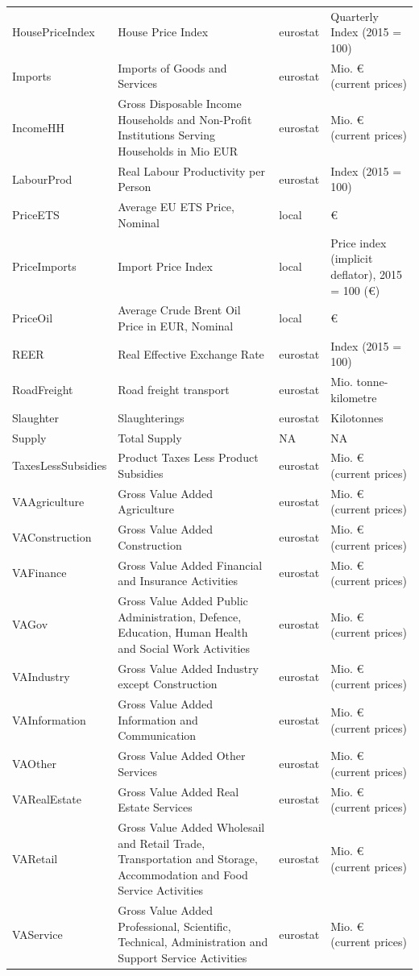 \begin{longtable}[t]{>{\raggedright\arraybackslash}p{3.5cm}>{\raggedright\arraybackslash}p{5.5cm}>{\raggedright\arraybackslash}p{2cm}>{\raggedright\arraybackslash}p{4cm}}
HousePriceIndex & House Price Index & eurostat & Quarterly Index (2015 = 100)\\
Imports & Imports of Goods and Services & eurostat & Mio. € (current prices)\\
IncomeHH & Gross Disposable Income Households and Non-Profit Institutions Serving Households in Mio EUR & eurostat & Mio. € (current prices)\\
\addlinespace
LabourProd & Real Labour Productivity per Person & eurostat & Index (2015 = 100)\\
PriceETS & Average EU ETS Price, Nominal & local & €\\
PriceImports & Import Price Index & local & Price index (implicit deflator), 2015 = 100 (€)\\
PriceOil & Average Crude Brent Oil Price in EUR, Nominal & local & €\\
REER & Real Effective Exchange Rate & eurostat & Index (2015 = 100)\\
\addlinespace
RoadFreight & Road freight transport & eurostat & Mio. tonne-kilometre\\
Slaughter & Slaughterings & eurostat & Kilotonnes\\
Supply & Total Supply & NA & NA\\
TaxesLessSubsidies & Product Taxes Less Product Subsidies & eurostat & Mio. € (current prices)\\
VAAgriculture & Gross Value Added Agriculture & eurostat & Mio. € (current prices)\\
\addlinespace
VAConstruction & Gross Value Added Construction & eurostat & Mio. € (current prices)\\
VAFinance & Gross Value Added Financial and Insurance Activities & eurostat & Mio. € (current prices)\\
VAGov & Gross Value Added Public Administration, Defence, Education, Human Health and Social Work Activities & eurostat & Mio. € (current prices)\\
VAIndustry & Gross Value Added Industry except Construction & eurostat & Mio. € (current prices)\\
VAInformation & Gross Value Added Information and Communication & eurostat & Mio. € (current prices)\\
\addlinespace
VAOther & Gross Value Added Other Services & eurostat & Mio. € (current prices)\\
VARealEstate & Gross Value Added Real Estate Services & eurostat & Mio. € (current prices)\\
VARetail & Gross Value Added Wholesail and Retail Trade, Transportation and Storage, Accommodation and Food Service Activities & eurostat & Mio. € (current prices)\\
VAService & Gross Value Added Professional, Scientific, Technical, Administration and Support Service Activities & eurostat & Mio. € (current prices)\\
\bottomrule
\end{longtable}
\endgroup{}
